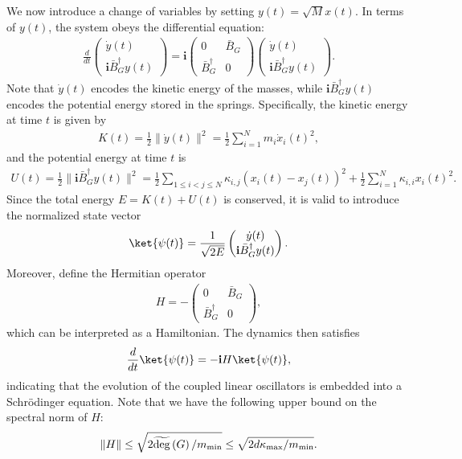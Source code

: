 \documentclass[superscriptaddress,onecolumn,nofootinbib,longbibliography,a4paper,accepted=2026-09-29]{quantumarticle}
\theoremstyle{plain}
\theoremstyle{definition}
\numberwithin{thm}{section}
\numberwithin{assumption}{section}
\numberwithin{lemma}{section}
\numberwithin{prop}{section}
\numberwithin{cor}{section}
\numberwithin{definition}{section}
\numberwithin{rmk}{section}
\numberwithin{equation}{section}
\newcommand{\norm}[1]     {\left\| #1 \right\|}
\newcommand{\lrb}[1]{\left ( #1 \right )}
\renewcommand{\i}{\ensuremath{\mathbf{i}}}
\newcommand{\tdeg}[1]{\widetilde{\operatorname{deg}}\lrb{#1}}
\begin{document}
We now introduce a change of variables by setting $y(t)=\sqrt{M} x(t)$. In terms of $y(t)$, the system obeys the differential equation:
\begin{align}
  \frac{d}{dt}  \begin{pmatrix}
\dot{y}(t) \\
\i \bar{B}_G^{\dagger} y(t)
    \end{pmatrix}
    = \i \begin{pmatrix}
        0 & \bar{B}_G \\
        \bar{B}_G^{\dagger} & 0
    \end{pmatrix}
    \begin{pmatrix}
\dot{y}(t) \\
\i \bar{B}_G^{\dagger} y(t)
    \end{pmatrix}.
    \label{eq:embedding_linear_oscillator_schrodinger_equation}
\end{align}
Note that \( \dot{y}(t) \) encodes the kinetic energy of the masses, while \( \i \bar{B}_G^{\dagger} y(t) \) encodes the potential energy stored in the springs. Specifically, the kinetic energy at time $t$ is given by
\begin{align}
K(t) = \frac{1}{2} \| \dot{y}(t) \|^2 = \frac{1}{2} \sum_{i=1}^N m_i \dot{x}_i(t)^2,
\end{align}
and the potential energy at time $t$ is
\begin{align}
U(t) = \frac{1}{2} \| \i \bar{B}_G^{\dagger} y(t) \|^2 = \frac{1}{2} \sum_{1\le i<j\le N} \kappa_{i,j} \left( x_i(t) - x_j(t) \right)^2+\frac{1}{2}\sum_{i=1}^N\kappa_{i,i}x_i(t)^2.
\end{align}
Since the total energy \( E = K(t) + U(t) \) is conserved, it is valid to introduce the normalized state vector
\begin{align}
\ket{\psi(t)} = \frac{1}{\sqrt{2E}} \begin{pmatrix}
\dot{y}(t) \\
\i \bar{B}_G^{\dagger} y(t)
\end{pmatrix}.
\end{align}
Moreover, define the Hermitian operator
\begin{align}
H = -\begin{pmatrix}
0 & \bar{B}_G \\
\bar{B}_G^{\dagger} & 0
\end{pmatrix},
\end{align}
which can be interpreted as a Hamiltonian.  
The dynamics then satisfies
\begin{align}
\frac{d}{dt} \ket{\psi(t)} = -\i H \ket{\psi(t)},
\label{eq:schrodinger_equation_for_linear_oscillators}
\end{align}
indicating that the evolution of the coupled linear oscillators is embedded into a Schr\"{o}dinger equation. Note that we have the following upper bound on the spectral norm of $H$:
\begin{align}
\norm{H} \le \sqrt{2\tdeg{G}/m_{\mathrm{min}}} \le \sqrt{2 d\kappa_{\rm max}/m_{\mathrm{min}}}.    
\end{align}
\end{document}

